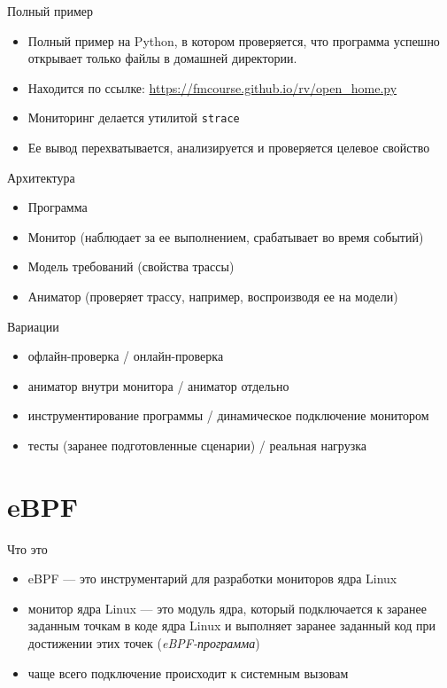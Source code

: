 \documentclass[hyperref={unicode=true}]{beamer}
\begin{document}
    \begin{frame}{Полный пример}
    \begin{itemize}
    \item Полный пример на Python, в котором проверяется, что
    программа успешно открывает только файлы в домашней директории.
    \item Находится по ссылке: \url{https://fmcourse.github.io/rv/open_home.py}
    \item Мониторинг делается утилитой \texttt{strace}
    \item Ее вывод перехватывается, анализируется и проверяется
    целевое свойство
    \end{itemize}
    \end{frame}

    \begin{frame}{Архитектура}
    \begin{itemize}
    \item Программа
    \item Монитор (наблюдает за ее выполнением, срабатывает во время
                событий)
    \item Модель требований (свойства трассы)
    \item Аниматор (проверяет трассу, например, воспроизводя ее на модели)
    \end{itemize}
    \end{frame}

    \begin{frame}{Вариации}
    \begin{itemize}
    \item офлайн-проверка / онлайн-проверка
    \item аниматор внутри монитора / аниматор отдельно
    \item инструментирование программы / динамическое подключение монитором
    \item тесты (заранее подготовленные сценарии) / реальная нагрузка
    \end{itemize}
    \end{frame}

    \section{eBPF}

    \begin{frame}{Что это}
    \begin{itemize}
    \item eBPF --- это инструментарий для разработки мониторов ядра Linux
    \item монитор ядра Linux --- это модуль ядра, который подключается
    к заранее заданным точкам в коде ядра Linux и выполняет заранее
    заданный код при достижении этих точек (\emph{eBPF-программа})
    \item чаще всего подключение происходит к системным вызовам
    \end{itemize}
    \end{frame}
\end{document}
